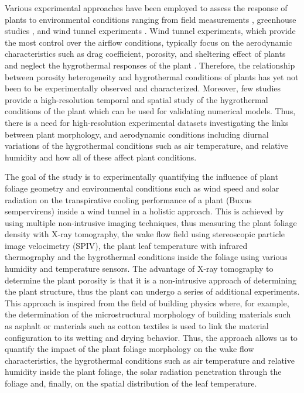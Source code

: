 Various experimental approaches have been employed to assess the response of plants to environmental conditions ranging from field measurements \citep{Dellwik2019,Grant1998,Hagishima2007,Koizumi2016,Shashua-Bar2009b,Shashua-Bar2000a,Yuan2017}, greenhouse studies \citep{Fatnassi2006,Ganguly2009,Majdoubi2009,Montero2001}, and wind tunnel experiments \citep{Grace1977,Liu2018,Manickathan2018b,Miri2019,Rudnicki2004,Vollsinger2005,Yue2008}. Wind tunnel experiments, which provide the most control over the airflow conditions, typically focus on the aerodynamic characteristics such as drag coefficient, porosity, and sheltering effect of plants and neglect the hygrothermal responses of the plant \citep{Grace1977,Manickathan2018b}. Therefore, the relationship between porosity heterogeneity and hygrothermal conditions of plants has yet not been to be experimentally observed and characterized. Moreover, few studies provide a high-resolution temporal and spatial study of the hygrothermal conditions of the plant which can be used for validating numerical models. Thus, there is a need for high-resolution experimental datasets investigating the links between plant morphology, and aerodynamic conditions including diurnal variations of the hygrothermal conditions such as air temperature, and relative humidity and how all of these affect plant conditions. 

The goal of the study is to experimentally quantifying the influence of plant foliage geometry and environmental conditions such as wind speed and solar radiation on the transpirative cooling performance of a plant (Buxus sempervirens) inside a wind tunnel in a holistic approach. This is achieved by using multiple non-intrusive imaging techniques, thus measuring the plant foliage density with X-ray tomography, the wake flow field using stereoscopic particle image velocimetry (SPIV), the plant leaf temperature with infrared thermography and the hygrothermal conditions inside the foliage using various humidity and temperature sensors. The advantage of X-ray tomography to determine the plant porosity is that it is a non-intrusive approach of determining the plant structure, thus the plant can undergo a series of additional experiments. This approach is inspired from the field of building physics where, for example, the determination of the microstructural morphology of building materials such as asphalt \citep{Lal2016,Lal2017} or materials such as cotton textiles \citep{Parada2017} is used to link the material configuration to its wetting and drying behavior. Thus, the approach allows us to quantify the impact of the plant foliage morphology on the wake flow characteristics, the hygrothermal conditions such as air temperature and relative humidity inside the plant foliage, the solar radiation penetration through the foliage and, finally, on the spatial distribution of the leaf temperature. 

